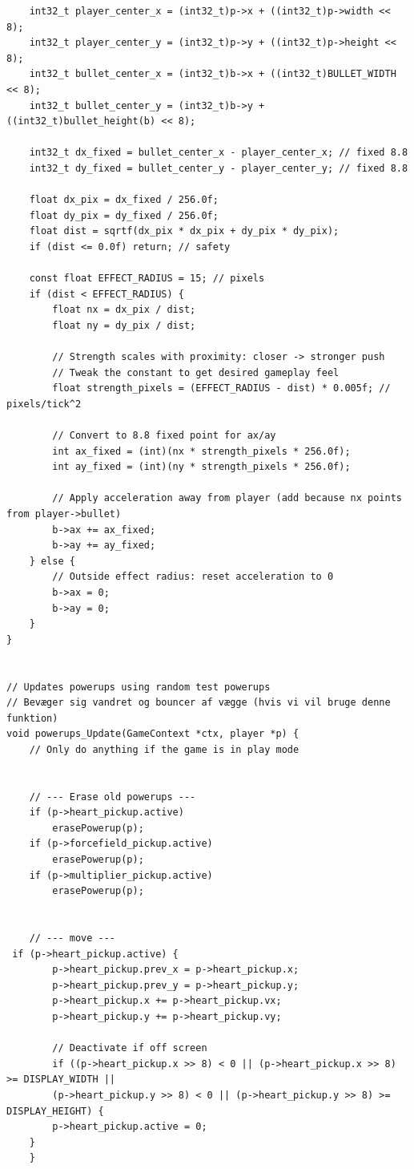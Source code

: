 \begin{lstlisting}
    int32_t player_center_x = (int32_t)p->x + ((int32_t)p->width << 8);
    int32_t player_center_y = (int32_t)p->y + ((int32_t)p->height << 8);
    int32_t bullet_center_x = (int32_t)b->x + ((int32_t)BULLET_WIDTH << 8);
    int32_t bullet_center_y = (int32_t)b->y + ((int32_t)bullet_height(b) << 8);

    int32_t dx_fixed = bullet_center_x - player_center_x; // fixed 8.8
    int32_t dy_fixed = bullet_center_y - player_center_y; // fixed 8.8

    float dx_pix = dx_fixed / 256.0f;
    float dy_pix = dy_fixed / 256.0f;
    float dist = sqrtf(dx_pix * dx_pix + dy_pix * dy_pix);
    if (dist <= 0.0f) return; // safety

    const float EFFECT_RADIUS = 15; // pixels
    if (dist < EFFECT_RADIUS) {
        float nx = dx_pix / dist;
        float ny = dy_pix / dist;

        // Strength scales with proximity: closer -> stronger push
        // Tweak the constant to get desired gameplay feel
        float strength_pixels = (EFFECT_RADIUS - dist) * 0.005f; // pixels/tick^2

        // Convert to 8.8 fixed point for ax/ay
        int ax_fixed = (int)(nx * strength_pixels * 256.0f);
        int ay_fixed = (int)(ny * strength_pixels * 256.0f);

        // Apply acceleration away from player (add because nx points from player->bullet)
        b->ax += ax_fixed;
        b->ay += ay_fixed;
    } else {
        // Outside effect radius: reset acceleration to 0
        b->ax = 0;
        b->ay = 0;
    }
}


// Updates powerups using random test powerups
// Bevæger sig vandret og bouncer af vægge (hvis vi vil bruge denne funktion)
void powerups_Update(GameContext *ctx, player *p) {
    // Only do anything if the game is in play mode
    

    // --- Erase old powerups ---
    if (p->heart_pickup.active)
        erasePowerup(p);
    if (p->forcefield_pickup.active)
        erasePowerup(p);
    if (p->multiplier_pickup.active)
        erasePowerup(p);


    // --- move ---
 if (p->heart_pickup.active) {
        p->heart_pickup.prev_x = p->heart_pickup.x;
        p->heart_pickup.prev_y = p->heart_pickup.y;
        p->heart_pickup.x += p->heart_pickup.vx;
        p->heart_pickup.y += p->heart_pickup.vy;

        // Deactivate if off screen
        if ((p->heart_pickup.x >> 8) < 0 || (p->heart_pickup.x >> 8) >= DISPLAY_WIDTH ||
        (p->heart_pickup.y >> 8) < 0 || (p->heart_pickup.y >> 8) >= DISPLAY_HEIGHT) {
        p->heart_pickup.active = 0;
    }
    }


\end{lstlisting}
